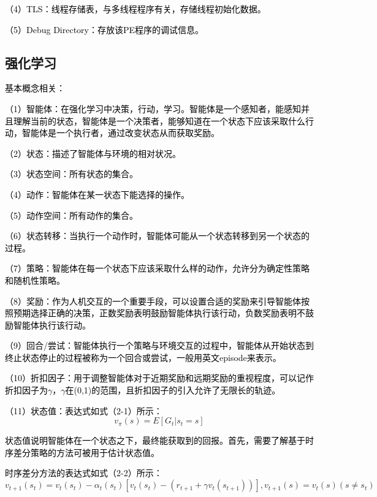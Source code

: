\textcolor{black}{（4）TLS：线程存储表，与多线程程序有关，存储线程初始化数据。}

\textcolor{black}{（5）Debug Directory：存放该PE程序的调试信息。}

\subsection{强化学习}

\textcolor{black}{基本概念相关：}

\textcolor{black}{（1）智能体：在强化学习中决策，行动，学习。智能体是一个感知者，能感知并且理解当前的状态，智能体是一个决策者，能够知道在一个状态下应该采取什么行动，智能体是一个执行者，通过改变状态从而获取奖励。}

\textcolor{black}{（2）状态：描述了智能体与环境的相对状况。}

\textcolor{black}{（3）状态空间：所有状态的集合。}

\textcolor{black}{（4）动作：智能体在某一状态下能选择的操作。}

\textcolor{black}{（5）动作空间：所有动作的集合。}

\textcolor{black}{（6）状态转移：当执行一个动作时，智能体可能从一个状态转移到另一个状态的过程。}

\textcolor{black}{（7）策略：智能体在每一个状态下应该采取什么样的动作，允许分为确定性策略和随机性策略。}

\textcolor{black}{（8）奖励：作为人机交互的一个重要手段，可以设置合适的奖励来引导智能体按照预期选择正确的决策，正数奖励表明鼓励智能体执行该行动，负数奖励表明不鼓励智能体执行该行动。}

\textcolor{black}{（9）回合/尝试：智能体执行一个策略与环境交互的过程中，智能体从开始状态到终止状态停止的过程被称为一个回合或尝试，一般用英文episode来表示。}

\textcolor{black}{（10）折扣因子：用于调整智能体对于近期奖励和远期奖励的重视程度，可以记作折扣因子为$\gamma$，$\gamma$在(0,1)的范围，且折扣因子的引入允许了无限长的轨迹。}

\textcolor{black}{（11）状态值：表达式如式（2-1）所示：}
\begin{equation}
v_{\pi}(s)=E[G_{t}|s_{t}=s]
\end{equation}

\textcolor{black}{状态值说明智能体在一个状态之下，最终能获取到的回报。首先，需要了解基于时序差分策略的方法可被用于估计状态值。}

\textcolor{black}{时序差分方法的表达式如式（2-2）所示：}
\begin{equation}
v_{t+1}(s_{t})  =v_{t}(s_{t})-\alpha_{t}(s_{t})[v_{t}(s_{t})-(r_{t+1}+\gamma v_{t}(s_{t+1}))],
v_{t+1}(s)=v_{t}(s)(s\neq s_{t})
\end{equation}

